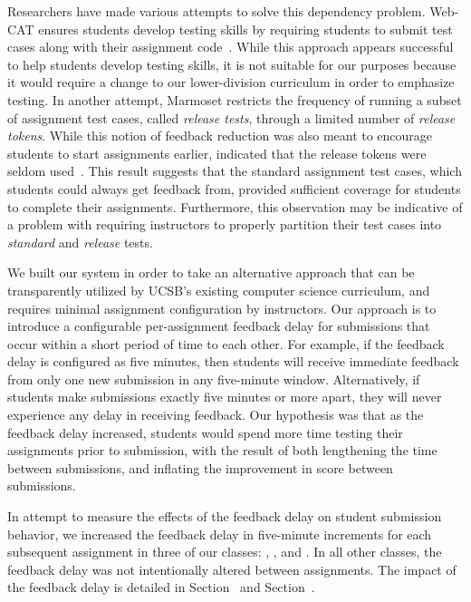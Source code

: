 Researchers have made various attempts to solve this dependency
problem. Web-CAT ensures students develop testing skills by requiring students
to submit test cases along with their assignment
code~\cite{Edwards:2003:RCS:949344.949390}. While this approach appears
successful to help students develop testing skills, it is not suitable for our
purposes because it would require a change to our lower-division curriculum in
order to emphasize testing. In another attempt, Marmoset restricts the
frequency of running a subset of assignment test cases, called \emph{release
  tests}, through a limited number of \emph{release tokens}. While this notion
of feedback reduction was also meant to encourage students to start assignments
earlier, \spacco{} indicated that the release tokens were seldom
used~\cite{Spacco:2013:TIP:2462476.2465594}. This result suggests that the
standard assignment test cases, which students could always get feedback from,
provided sufficient coverage for students to complete their
assignments. Furthermore, this observation may be indicative of a problem with
requiring instructors to properly partition their test cases into
\emph{standard} and \emph{release} tests.

We built our system in order to take an alternative approach that can be
transparently utilized by UCSB's existing computer science curriculum, and
requires minimal assignment configuration by instructors. Our approach is to
introduce a configurable per-assignment feedback delay for submissions that
occur within a short period of time to each other. For example, if the feedback
delay is configured as five minutes, then students will receive immediate
feedback from only one new submission in any five-minute window. Alternatively,
if students make submissions exactly five minutes or more apart, they will
never experience any delay in receiving feedback. Our hypothesis was that as
the feedback delay increased, students would spend more time testing their
assignments prior to submission, with the result of both lengthening the time
between submissions, and inflating the improvement in score between
submissions.

In attempt to measure the effects of the feedback delay on student submission
behavior, we increased the feedback delay in five-minute increments for each
subsequent assignment in three of our classes: , , and
. In all other classes, the feedback delay was not intentionally
altered between assignments. The impact of the feedback delay is detailed in
Section~ and Section~.


